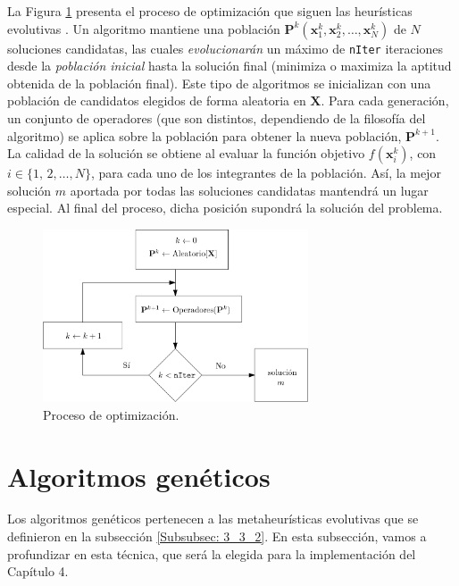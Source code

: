 \documentclass[12pt,a4paper]{book}
\begin{document}
La Figura \ref{fig:proceso_opti} presenta el proceso de optimización que siguen las heurísticas evolutivas \cite{cuevas_matlab_2021}. Un algoritmo mantiene una población $\mathbf{P}^k(\mathbf{x}^k_1,\mathbf{x}^k_2, \ldots, \mathbf{x}^k_N)$ de $N$ soluciones candidatas, las cuales \textsl{evolucionarán} un máximo de \texttt{nIter} iteraciones desde la \textsl{población inicial} hasta la solución final (minimiza o maximiza la aptitud obtenida de la población final). Este tipo de algoritmos se inicializan con una población de candidatos elegidos de forma aleatoria en $\mathbf{X}$. Para cada generación, un conjunto de operadores (que son distintos, dependiendo de la filosofía del algoritmo) se aplica sobre la población para obtener la nueva población, $\mathbf{P}^{k+1}$. La calidad de la solución se obtiene al evaluar la función objetivo $f(\mathbf{x}^k_i)$,  con $i \in \{1, \, 2, \ldots, N\}$, para cada uno de los integrantes de la población. Así, la mejor solución $m$ aportada por todas las soluciones candidatas mantendrá un lugar especial. Al final del proceso, dicha posición supondrá la solución del problema.  

\begin{figure}[h]
    \begin{center}
    \includegraphics[width=0.7\textwidth]{img/proceso_opti.png}
    \end{center}
    \caption{Proceso de optimización.}
    \label{fig:proceso_opti}
\end{figure} 
 
\section{Algoritmos genéticos} \label{Subsec: 3_4}
Los algoritmos genéticos pertenecen a las metaheurísticas evolutivas que se definieron en la subsección \ref{Subsubsec: 3_3_2}.
En esta subsección, vamos a profundizar en esta técnica, que será la elegida para la implementación del Capítulo 4.
\end{document}
